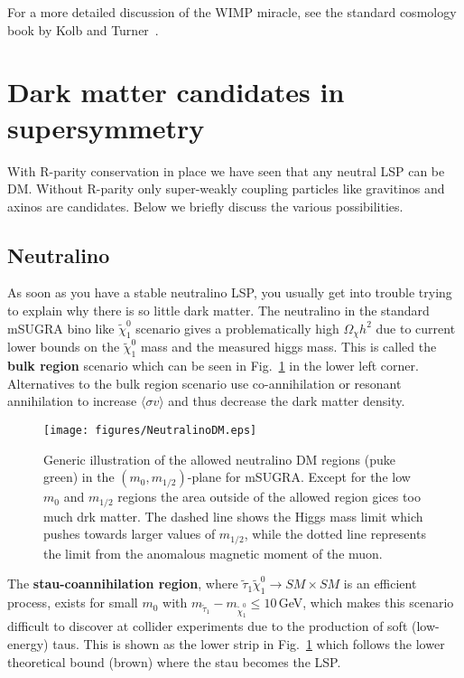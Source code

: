 \documentclass[notes.tex]{subfiles}
\begin{document}
For a more detailed discussion of the WIMP miracle, see the standard cosmology book by Kolb and Turner~\cite{Kolb:1990vq}.

\section{Dark matter candidates in supersymmetry}
With R-parity conservation in place we have seen that  any neutral LSP can be DM. Without R-parity only super-weakly coupling particles like gravitinos and axinos are candidates. Below we briefly discuss the various possibilities.

\subsection{Neutralino}
As soon as you have a stable neutralino LSP, you usually get into trouble trying to explain why there is so little dark matter. The neutralino in the standard mSUGRA bino like $\tilde{\chi}^0_1$ scenario gives a problematically high $\Omega_\chi h^2$ due to current lower bounds on the $\tilde{\chi}^0_1$ mass and the measured higgs mass. This is called the {\bf bulk region} scenario which can be seen in Fig.~\ref{NeuDM} in the lower left corner.  Alternatives to the bulk region scenario use co-annihilation or resonant annihilation to increase $\langle \sigma v \rangle$ and thus decrease the dark matter density.

\begin{figure}[h!]
\begin{center}
\texttt{[image: figures/NeutralinoDM.eps]} 
\caption{Generic illustration of the allowed neutralino DM regions (puke green) in the $(m_0,m_{1/2})$-plane for mSUGRA. Except for the low $m_0$ and $m_{1/2}$ regions the area outside of the allowed region gices too much drk matter. The dashed line shows the Higgs mass limit which pushes towards larger values of $m_{1/2}$, while the dotted line represents the limit from the anomalous magnetic moment of the muon.\label{NeuDM}}
\end{center}
\end{figure}

The {\bf stau-coannihilation region}, where $\tilde{\tau}_1 \tilde{\chi}^0_1 \to SM\times SM$ is an efficient process, exists for small $m_0$ with $m_{\tilde{\tau}_1} - m_{\tilde{\chi}^0_1}\leq 10$\,GeV, which makes this scenario difficult to discover at collider experiments due to the production of soft (low-energy) taus. This is  shown as the lower strip in Fig.~\ref{NeuDM} which follows the lower theoretical bound (brown) where the stau becomes the LSP.
\end{document}
